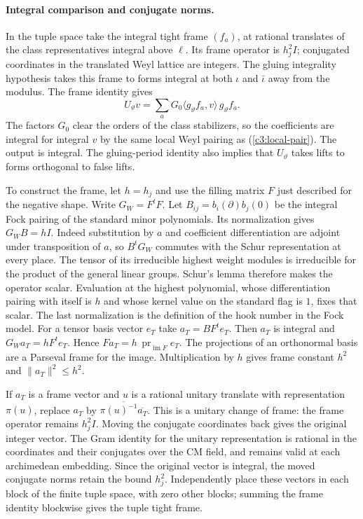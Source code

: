 \paragraph{Integral comparison and conjugate norms.}
In the tuple space take the integral tight frame $(f_a)$, at rational
translates of the class representatives integral above $\ell$.
Its frame operator is $h_j^2 I$; conjugated coordinates in the
translated Weyl lattice are integers. The gluing integrality hypothesis takes this
frame to forms integral at both $\iota$ and $\bar\iota$ away from
the modulus. The frame identity gives
\[
 U_\vartheta v=\sum_a G_0
       \langle g_\vartheta f_a,v\rangle\,g_\vartheta f_a .
\]
The factors $G_0$ clear the orders of the class stabilizers, so the
coefficients are integral for integral $v$ by the same local Weyl
pairing as (\ref{c3:local-pair}). The output is integral.
The gluing-period identity also implies that $U_\vartheta$ takes
lifts to forms orthogonal to false lifts.

To construct the frame, let $h=h_j$ and use the filling matrix $F$
just described for the negative shape. Write $G_W=F^tF$.
Let $B_{ij}=b_i(\partial)b_j(0)$ be the integral Fock pairing of
the standard minor polynomials. Its normalization gives
$G_WB=h I$. Indeed substitution by $a$ and coefficient differentiation
are adjoint under transposition of $a$, so $B^tG_W$ commutes with
the Schur representation at every place. The tensor of its
irreducible highest weight modules is irreducible for the product
of the general linear groups. Schur's lemma therefore makes the
operator scalar. Evaluation at the highest polynomial, whose
differentiation pairing with itself is $h$ and whose kernel value
on the standard flag is $1$, fixes that scalar. The last
normalization is the definition of the hook number in the Fock
model. For a tensor basis vector $e_T$ take $a_T=BF^te_T$.
Then $a_T$ is integral and $G_Wa_T=hF^te_T$. Hence
$Fa_T=h\,\operatorname{pr}_{\operatorname{im}F}e_T$.
The projections of an orthonormal basis are a Parseval frame for
the image. Multiplication by $h$ gives frame constant $h^2$ and
$\|a_T\|^2\le h^2$.

If $a_T$ is a frame vector
and $u$ is a rational unitary translate with representation
$\pi(u)$, replace $a_T$ by
$\overline{\pi(u)^{-1}\overline{a_T}}$.
This is a unitary change of frame: the frame operator remains
$h_j^2 I$. Moving the conjugate coordinates back gives the
original integer vector. The Gram identity for the unitary
representation is rational in the coordinates and their
conjugates over the CM field, and remains valid at each
archimedean embedding. Since the original vector is integral,
the moved conjugate norms retain the bound $h_j^2$.
Independently place these vectors in each block of the finite
tuple space, with zero other blocks; summing the frame identity
blockwise gives the tuple tight frame.

